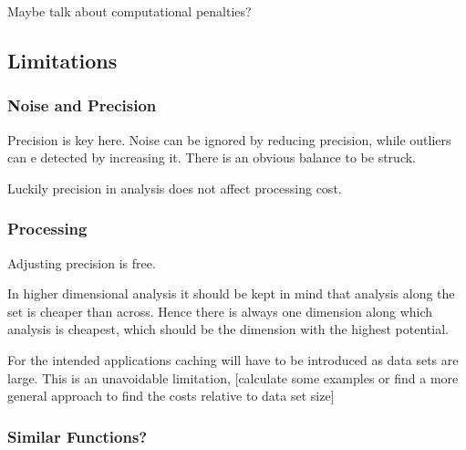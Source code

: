 \documentclass[main.tex]{subfiles}
\begin{document}
  Maybe talk about computational penalties? 
  
  \subsection{Limitations}
  \subsubsection{Noise and Precision}
  Precision is key here. Noise can be ignored by reducing precision, while outliers can e detected by increasing it. There is an obvious balance to be struck.
  
  Luckily precision in analysis does not affect processing cost.
  \subsubsection{Processing}
  Adjusting precision is free.
  
  In higher dimensional analysis it should be kept in mind that analysis along the set is cheaper than across. Hence there is always one dimension along which analysis is cheapest, which should be the dimension with the highest potential.
  
  For the intended applications caching will have to be introduced as data sets are large. This is an unavoidable limitation, [calculate some examples or find a more general approach to find  the costs relative to data set size]
  \subsubsection{Similar Functions?}
  
  
\end{document}
